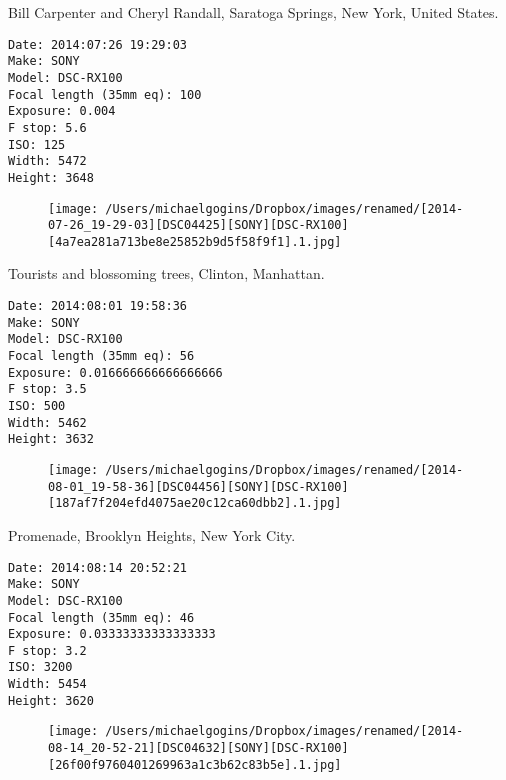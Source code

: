 \documentclass[11pt,letter,DIV=14,paper=landscape]{scrbook}
\begin{document}
\clearpage
\noindent Bill Carpenter and Cheryl Randall, Saratoga Springs, New York, United States.
\noindent
\begin{lstlisting}
Date: 2014:07:26 19:29:03
Make: SONY
Model: DSC-RX100
Focal length (35mm eq): 100
Exposure: 0.004
F stop: 5.6
ISO: 125
Width: 5472
Height: 3648
\end{lstlisting}
\clearpage

\begin{figure}
\texttt{[image: /Users/michaelgogins/Dropbox/images/renamed/[2014-07-26\_19-29-03][DSC04425][SONY][DSC-RX100][4a7ea281a713be8e25852b9d5f58f9f1].1.jpg]}
\end{figure}
    
\clearpage
\noindent Tourists and blossoming trees, Clinton, Manhattan.
\noindent
\begin{lstlisting}
Date: 2014:08:01 19:58:36
Make: SONY
Model: DSC-RX100
Focal length (35mm eq): 56
Exposure: 0.016666666666666666
F stop: 3.5
ISO: 500
Width: 5462
Height: 3632
\end{lstlisting}
\clearpage

\begin{figure}
\texttt{[image: /Users/michaelgogins/Dropbox/images/renamed/[2014-08-01\_19-58-36][DSC04456][SONY][DSC-RX100][187af7f204efd4075ae20c12ca60dbb2].1.jpg]}
\end{figure}
    
\clearpage
\noindent Promenade, Brooklyn Heights, New York City.
\noindent
\begin{lstlisting}
Date: 2014:08:14 20:52:21
Make: SONY
Model: DSC-RX100
Focal length (35mm eq): 46
Exposure: 0.03333333333333333
F stop: 3.2
ISO: 3200
Width: 5454
Height: 3620
\end{lstlisting}
\clearpage

\begin{figure}
\texttt{[image: /Users/michaelgogins/Dropbox/images/renamed/[2014-08-14\_20-52-21][DSC04632][SONY][DSC-RX100][26f00f9760401269963a1c3b62c83b5e].1.jpg]}
\end{figure}
    
\end{document}
